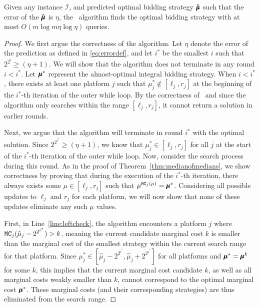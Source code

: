 
\begin{theorem}\label{thm:momwithpredictions}
Given any instance $\mathcal{I}$, and predicted optimal bidding strategy $\mathbf{\hat{\pmb{\mu}}}$ such that the error of the $\mathbf{\hat{\pmb{\mu}}}$ is $\eta$, the \bmom\ algorithm finds the optimal bidding strategy with at most $O(m \log m \eta \log \eta)$ queries.
\end{theorem}
\begin{proof}
We first argue the correctness of the algorithm. Let \( \eta \) denote the error of the prediction as defined in \eqref{eq:errordef}, and let \( i^* \) be the smallest \( i \) such that \( 2^{2^i} \geq (\eta + 1) \). We will show that the algorithm does not terminate in any round \( i < i^* \). Let \( \pmb{\mu}^* \) represent the almost-optimal integral bidding strategy. When \( i < i^* \), there exists at least one platform \( j \) such that \( \mu^*_j \notin [\ell_j, r_j] \) at the beginning of the \( i^* \)-th iteration of the outer while loop. By the correctness of \optcheck\ and since the algorithm only searches within the range \( [\ell_j, r_j] \), it cannot return a solution in earlier rounds.

Next, we argue that the algorithm will terminate in round \( i^* \) with the optimal solution. Since \( 2^{2^{i^*}} \geq (\eta + 1) \), we know that \( \mu^*_j \in [\ell_j, r_j] \) for all \( j \) at the start of the \( i^* \)-th iteration of the outer while loop. Now, consider the search process during this round. As in the proof of Theorem~\ref{thm:medianofmedians}, we show correctness by proving that during the execution of the \( i^* \)-th iteration, there always exists some \( \mu \in [\ell_j, r_j] \) such that \( \mu^{\texttt{MC}_j(\mu)} = \pmb{\mu}^* \). Considering all possible updates to \( \ell_j \) and \( r_j \) for each platform, we will now show that none of these updates eliminate any such \( \mu \) values.

First, in Line~\ref{line:leftcheck}, the algorithm encounters a platform \( j \) where \( \texttt{MC}_j(\hat{\mu}_j - 2^{2^{i^*}}) > k \), meaning the current candidate marginal cost \( k \) is smaller than the marginal cost of the smallest strategy within the current search range for that platform. Since \( \mu^*_j \in [\hat{\mu}_j - 2^{2^{i^*}}, \hat{\mu}_j + 2^{2^{i^*}}] \) for all platforms and \( \pmb{\mu}^* = \pmb{\mu}^k \) for some \( k \), this implies that the current marginal cost candidate \( k \), as well as all marginal costs weakly smaller than \( k \), cannot correspond to the optimal marginal cost \( \pmb{\mu}^* \). These marginal costs (and their corresponding strategies) are thus eliminated from the search range.


\end{proof}
